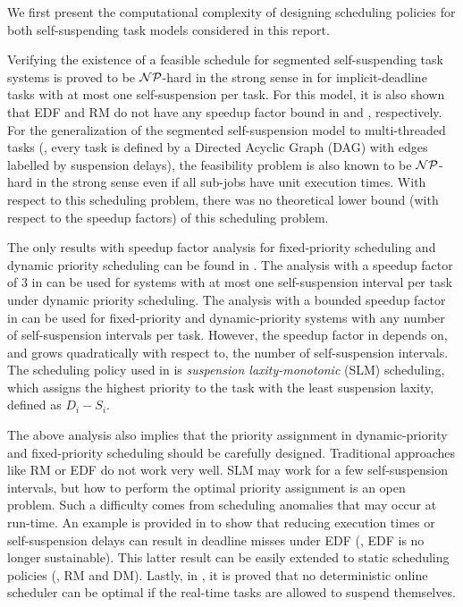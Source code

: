 
We first present the computational complexity of designing scheduling policies for both self-suspending task models considered in this report.

Verifying the existence of a feasible schedule for segmented self-suspending task systems is proved to be ${\cal NP}$-hard in the strong sense in \cite{Ridouard_2004} for implicit-deadline tasks with at most one self-suspension per task. For this model, it is also shown that EDF and RM do not have any speedup factor bound in \cite{Ridouard_2004} and \cite{RTSS-ChenL14}, respectively. For the generalization of the segmented self-suspension model to multi-threaded tasks (\ie, every task is defined by a Directed Acyclic Graph (DAG) with edges labelled by suspension delays), the feasibility problem is also known to be  ${\cal NP}$-hard in the strong sense  \cite{Ric03} even if all sub-jobs have unit execution times. With respect to this scheduling problem, there was no theoretical lower bound (with respect to the speedup factors) of this scheduling problem. 

 The only results with speedup factor analysis for fixed-priority scheduling and dynamic priority scheduling can be found in \cite{RTSS-ChenL14,WC16-suspend-DATE,Bruggen16RTNS}. The analysis with a speedup factor of $3$ in \cite{RTSS-ChenL14,Bruggen16RTNS} can be used for systems with at most one self-suspension interval per task under dynamic priority scheduling. The analysis with a bounded speedup factor in \cite{WC16-suspend-DATE} can be used for fixed-priority and dynamic-priority systems with any number of self-suspension intervals per task. However, the speedup factor in \cite{WC16-suspend-DATE} depends on, and grows quadratically with respect to, the number of self-suspension intervals. 
 The scheduling policy used in \cite{WC16-suspend-DATE} is \emph{suspension laxity-monotonic} (SLM) scheduling, which assigns the highest priority to the task with the least suspension laxity, defined as $D_i-S_i$.


The above analysis also implies that the priority assignment in dynamic-priority and fixed-priority scheduling should be carefully designed. Traditional approaches like RM or EDF do not work very well. SLM may work for a few self-suspension intervals, but how to perform the optimal priority assignment is an open problem. Such a difficulty comes from scheduling anomalies that may occur at run-time. An example is provided in \cite{Ridouard_2004}  to show that reducing execution times or self-suspension delays can result in deadline misses under EDF (\ie, EDF is no longer sustainable). This latter result can be easily extended to static scheduling policies (\ie, RM and DM). Lastly, in \cite{RidouardR06}, it is proved that no deterministic online scheduler can be optimal if the real-time tasks are allowed to suspend themselves.



